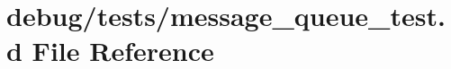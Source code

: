 \hypertarget{message__queue__test_8d}{
\section{debug/tests/message\_\-queue\_\-test.d File Reference}
\label{message__queue__test_8d}
}
